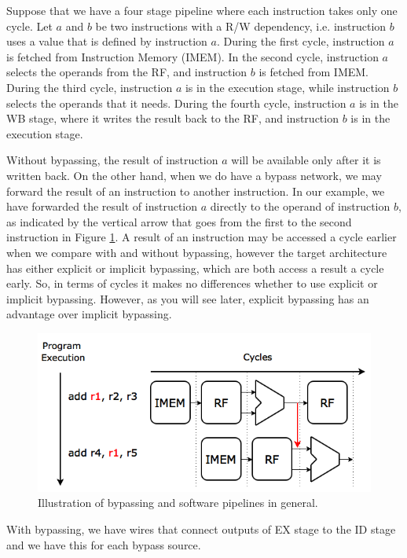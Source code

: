 Suppose that we have a four stage pipeline where each instruction takes only one cycle. Let $a$ and $b$ be two instructions with a R/W dependency, i.e. instruction $b$ uses a value that is defined by instruction $a$. During the first cycle, instruction $a$ is fetched from Instruction Memory (IMEM). In the second cycle, instruction $a$ selects the operands from the RF, and instruction $b$ is fetched from IMEM. During the third cycle, instruction $a$ is in the execution stage, while instruction $b$ selects the operands that it needs. During the fourth cycle, instruction $a$ is in the WB stage, where it writes the result back to the RF, and instruction $b$ is in the execution stage.

Without bypassing, the result of instruction $a$ will be available only after it is written back. On the other hand, when we do have a bypass network, we may forward the result of an instruction to another instruction. In our example, we have forwarded the result of instruction $a$ directly to the operand of instruction $b$, as indicated by the vertical arrow that goes from the first to the second instruction in Figure \ref{fig:bypass_principle}. A result of an instruction may be accessed a cycle earlier when we compare with and without bypassing, however the target architecture has either explicit or implicit bypassing, which are both access a result a cycle early. So, in terms of cycles it makes no differences whether to use explicit or implicit bypassing. However, as you will see later, explicit bypassing has an advantage over implicit bypassing.

\begin{figure}[H]
\centering
\includegraphics[width=.6\textwidth]{figures/bypassing_principle/05_bypassing_principle}
\caption{Illustration of bypassing and software pipelines in general.}
\label{fig:bypass_principle}
\end{figure}

With bypassing, we have wires that connect outputs of EX stage to the ID stage and we have this for each bypass source. 

